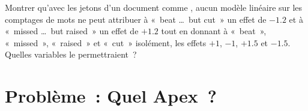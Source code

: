 \begin{exercise}[$\star\star\star$]\label{exo:ml:text-from-bag-of-words-to-embeddings:8}
Montrer qu'avec les jetons d'un document comme , aucun modèle linéaire sur les comptages de mots ne peut attribuer à «~beat \dots\ but cut~» un
effet de $-1.2$ et à «~missed \dots\ but raised~» un effet de $+1.2$ tout en donnant à «~beat~», «~missed~», «~raised~» et «~cut~»
isolément, les effets $+1$, $-1$, $+1.5$ et $-1.5$. Quelles variables le permettraient~?
\end{exercise}

\section{Problème~: Quel Apex~?}

